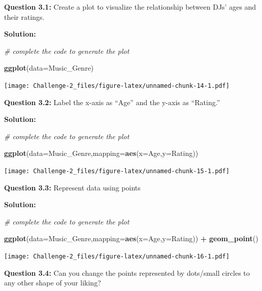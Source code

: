 \documentclass[
]{article}
\newenvironment{Shaded}{\begin{snugshade}}{\end{snugshade}}
\newcommand{\AttributeTok}[1]{\textcolor[rgb]{0.13,0.29,0.53}{#1}}
\newcommand{\CommentTok}[1]{\textcolor[rgb]{0.56,0.35,0.01}{\textit{#1}}}
\newcommand{\FunctionTok}[1]{\textcolor[rgb]{0.13,0.29,0.53}{\textbf{#1}}}
\newcommand{\NormalTok}[1]{#1}
\newcommand{\SpecialCharTok}[1]{\textcolor[rgb]{0.81,0.36,0.00}{\textbf{#1}}}
\begin{document}
\textbf{Question 3.1:} Create a plot to visualize the relationship
between DJs' ages and their ratings.

\textbf{Solution:}

\begin{Shaded}
\begin{Highlighting}[]
\CommentTok{\# complete the code to generate the plot}

\FunctionTok{ggplot}\NormalTok{(}\AttributeTok{data=}\NormalTok{Music\_Genre) }
\end{Highlighting}
\end{Shaded}

\texttt{[image: Challenge-2\_files/figure-latex/unnamed-chunk-14-1.pdf]}

\textbf{Question 3.2:} Label the x-axis as ``Age'' and the y-axis as
``Rating.''

\textbf{Solution:}

\begin{Shaded}
\begin{Highlighting}[]
\CommentTok{\# complete the code to generate the plot}

\FunctionTok{ggplot}\NormalTok{(}\AttributeTok{data=}\NormalTok{Music\_Genre,}\AttributeTok{mapping=}\FunctionTok{aes}\NormalTok{(}\AttributeTok{x=}\NormalTok{Age,}\AttributeTok{y=}\NormalTok{Rating))}
\end{Highlighting}
\end{Shaded}

\texttt{[image: Challenge-2\_files/figure-latex/unnamed-chunk-15-1.pdf]}

\textbf{Question 3.3:} Represent data using points

\textbf{Solution:}

\begin{Shaded}
\begin{Highlighting}[]
\CommentTok{\# complete the code to generate the plot}

\FunctionTok{ggplot}\NormalTok{(}\AttributeTok{data=}\NormalTok{Music\_Genre,}\AttributeTok{mapping=}\FunctionTok{aes}\NormalTok{(}\AttributeTok{x=}\NormalTok{Age,}\AttributeTok{y=}\NormalTok{Rating)) }\SpecialCharTok{+} \FunctionTok{geom\_point}\NormalTok{() }
\end{Highlighting}
\end{Shaded}

\texttt{[image: Challenge-2\_files/figure-latex/unnamed-chunk-16-1.pdf]}

\textbf{Question 3.4:} Can you change the points represented by
dots/small circles to any other shape of your liking?
\end{document}
